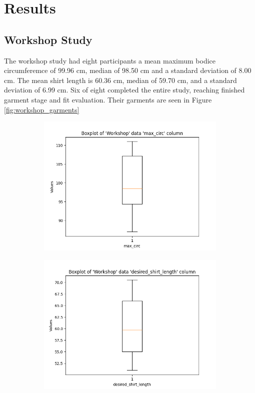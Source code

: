 \chapter{Results}

\section{Workshop Study}
The workshop study had eight participants a mean maximum bodice circumferemce of 99.96 cm, median of 98.50 cm and a standard deviation of 8.00 cm. The mean shirt length is 60.36 cm, median of 59.70 cm, and a standard deviation of 6.99 cm. Six of eight completed the entire study, reaching finished garment stage and fit evaluation. Their garments are seen in Figure \ref{fig:workshop_garments}
\begin{figure}[htb]
    \centering
    \begin{subfigure}[b]{0.45\textwidth}
        \centering
        \includegraphics[width=\textwidth]{Images/Workshop_max_circ_Boxplot.png}
        \caption{}
    \end{subfigure}
    \hfill
    \begin{subfigure}[b]{0.45\textwidth}
        \centering
        \includegraphics[width=\textwidth]{Images/Workshop_desired_shirt_length_Boxplot.png}
        \caption{}
    \end{subfigure}
    \caption{}
\end{figure}
